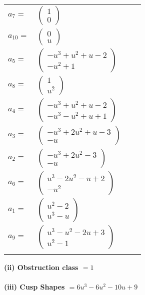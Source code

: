 \documentclass[1p]{elsarticle_modified}
\theoremstyle{definition}
\begin{document}
\begin{tabular}{m{7pt} m{180pt} m{7pt} m{180pt} }
\flushright $a_{7}=$&$\begin{pmatrix}1\\0\end{pmatrix}$ \\
\flushright $a_{10}=$&$\begin{pmatrix}0\\u\end{pmatrix}$ \\
\flushright $a_{5}=$&$\begin{pmatrix}- u^3+u^2+u-2\\- u^2+1\end{pmatrix}$ \\
\flushright $a_{8}=$&$\begin{pmatrix}1\\u^2\end{pmatrix}$ \\
\flushright $a_{4}=$&$\begin{pmatrix}- u^3+u^2+u-2\\- u^3- u^2+u+1\end{pmatrix}$ \\
\flushright $a_{3}=$&$\begin{pmatrix}- u^3+2 u^2+u-3\\- u\end{pmatrix}$ \\
\flushright $a_{2}=$&$\begin{pmatrix}- u^3+2 u^2-3\\- u\end{pmatrix}$ \\
\flushright $a_{6}=$&$\begin{pmatrix}u^3-2 u^2- u+2\\- u^2\end{pmatrix}$ \\
\flushright $a_{1}=$&$\begin{pmatrix}u^2-2\\u^3- u\end{pmatrix}$ \\
\flushright $a_{9}=$&$\begin{pmatrix}u^3- u^2-2 u+3\\u^2-1\end{pmatrix}$\\&\end{tabular}
\flushleft \textbf{(ii) Obstruction class $= 1$}\\~\\
\flushleft \textbf{(iii) Cusp Shapes $= 6 u^3-6 u^2-10 u+9$}\\~\\
\end{document}
